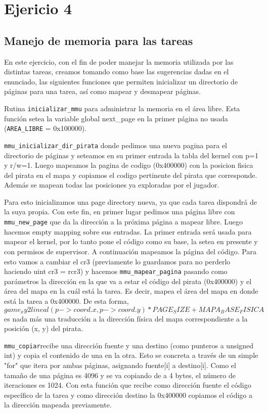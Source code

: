 \section{Ejericio 4}

\subsection{Manejo de memoria para las tareas}

En este ejercicio, con el fin de poder manejar la memoria utilizada por las distintas tareas, creamos tomando como base las sugerencias dadas en el enunciado, las siguientes funciones que permiten inicializar un directorio de páginas para una tarea, así como mapear y desmapear páginas.

Rutina \texttt{inicializar\_mmu} para administrar la memoria en el área libre. Esta función setea la variable global next\_page en la primer página no usada (\texttt{AREA\_LIBRE} = 0x100000). 

\texttt{mmu\_inicializar\_dir\_pirata}  donde pedimos una nueva pagina para el directorio de páginas y seteamos en su primer entrada la tabla del kernel con p=1 y r/w=1. Luego mapeamos la pagina de codigo (0x400000) con la posicion fisica del pirata en el mapa y copiamos el codigo pertinente del pirata que corresponde. Además se mapean todas las posiciones ya exploradas por el jugador.

Para esto inicializamos una page directory nueva, ya que cada tarea dispondrá de la suya propia. Con este fin, en primer lugar pedimos una página libre con \texttt{mmu\_new\_page} que da la dirección a la próxima página a mapear libre. Luego hacemos empty mapping sobre sus entradas.
La primer entrada será usada para mapear el kernel, por lo tanto pone el código como su base, la setea en presente y con permisos de supervisor.
A continuación mapeamos la página del código. Para esto vamos a cambiar el cr3 (previamente lo guardamos para no perderlo haciendo uint cr3 = rcr3) y hacemos \texttt{mmu\_mapear\_pagina} pasando como parámetros la dirección en la que va a estar el código del pirata (0x400000) y el área del mapa en la cuál está la tarea. Es decir, mapea el área del mapa en donde está la tarea a 0x400000. 
De esta forma, $game_xy2lineal(p->coord.x, p->coord.y) * PAGE_SIZE + MAPA_BASE_FISICA$ es nada más una traducción a la dirección física del mapa correspondiente a la posición (x, y) del pirata.

\texttt{mmu\_copiar}recibe una dirección fuente y una destino (como punteros a unsigned int) y copia el contenido de una en la otra.
Esto se concreta a través de un simple "for" que itera por ambas páginas, asignando fuente[i] a destino[i]. Como el tamaño de una página es 4096 y se va copiando de a 4 bytes, el número de iteraciones es 1024. Con esta función que recibe como dirección fuente el código específico de la tarea y como dirección destino la 0x400000 copiamos el código a la dirección mapeada previamente.


